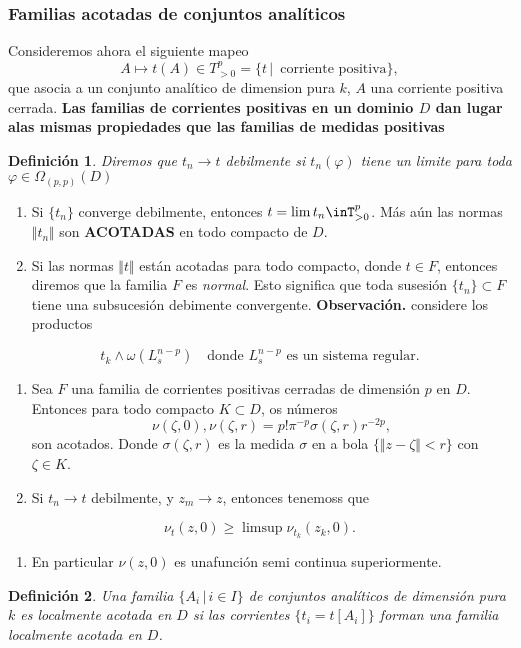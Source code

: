 \documentclass[letterpaper]{article}
\newtheorem{def.}{Definici\'on}[section]
\newcommand{\obs}{{\newline \noindent \sc \textbf{Observación. }}}
\newcommand{\om}{\ensuremath{\Omega}}
\begin{document}
\subsubsection{Familias acotadas de conjuntos analíticos}
\label{sec:orgd99d874}
Consideremos ahora el siguiente mapeo
\[
    A\mapsto t(A)\in T^p_{>0}=\{t\,|\,\text{ corriente positiva}\},
\]
\noindent que asocia a un conjunto analítico de dimension pura \(k\), \(A\) una corriente positiva cerrada.
\textbf{Las familias de corrientes positivas en un dominio \(D\) dan lugar alas mismas propiedades que las familias de medidas positivas}
\begin{def.}
Diremos que \(t_n\rightarrow t\) \emph{debilmente} si \(t_n(\varphi)\) tiene un limite para toda \(\varphi\in\om_(p,p)(D)\)
\end{def.}

\begin{enumerate}
\item Si \(\{t_n\}\) converge debilmente, entonces \(t=\lim t_n\inT^p_{>0}\). Más aún las normas \(\Vert t_n\Vert\) son \textbf{ACOTADAS} en todo compacto de \(D\).
\item Si las normas \(\Vert t\Vert\) están acotadas para todo compacto, donde \(t\in F\), entonces diremos que la familia \(F\) es \emph{normal}. Esto significa que toda susesión \(\{t_n\}\subset F\) tiene una subsucesión debimente convergente.
\obs considere los productos
\end{enumerate}
\[
    t_k\wedge\omega(L^{n-p}_s)\quad\text{donde }L^{n-p}_s\text{ es un sistema regular}.
\]
\begin{enumerate}
\item Sea \(F\) una familia de corrientes positivas cerradas de dimensión \(p\) en \(D\). Entonces para todo compacto \(K\subset D\), os números
\[
        \nu(\zeta,0),\nu(\zeta,r)=p!\pi^{-p}\sigma(\zeta,r)r^{-2p},
   \]
\noindent son acotados. Donde \(\sigma(\zeta,r)\) es la medida \(\sigma\) en a bola \(\{\Vert z-\zeta\Vert<r\}\) con \(\zeta\in K\).
\item Si \(t_n\rightarrow t\) debilmente, y \(z_m\rightarrow z\), entonces tenemoss que
\end{enumerate}
\begin{equation}
        \nu_t(z,0)\geq\limsup\nu_{t_k}(z_k,0).
\end{equation}
\begin{enumerate}
\item En particular \(\nu(z,0)\) es unafunción semi continua superiormente.
\end{enumerate}
\begin{def.}
Una familia \(\{A_i\,|\,i\in I\}\) de conjuntos analíticos de dimensión pura \(k\) es localmente acotada en \(D\) si las corrientes \(\{t_i=t[A_i]\}\) forman una familia localmente acotada en \(D\).
\end{def.}
\end{document}
